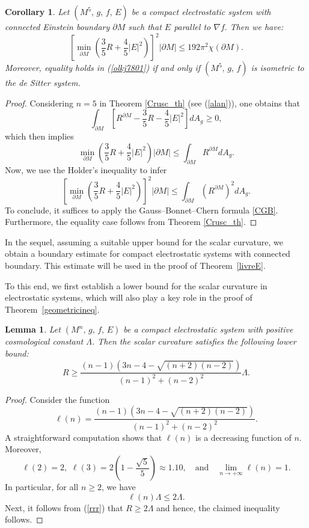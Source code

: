 \documentclass{amsart}
\newtheorem{corollary}{Corollary}
\newtheorem{lemma}{Lemma}
\numberwithin{equation}{section}
\begin{document}
\begin{corollary}\label{coro2alan}
Let $(M^5,\,g,\,f,\,E)$ be a compact electrostatic system with connected Einstein boundary $\partial M$ such that $E$ parallel to $\nabla f.$ Then we have:
		\begin{equation}
		\label{olkj7801}
			\left[\displaystyle\min_{\partial M}\left(\frac{3}{5}R+\frac{4}{5}|E|^{2}\right)\right]^{2}|\partial M|\leq 	192\pi^{2}\chi(\partial M).
		\end{equation} Moreover, equality holds in (\ref{olkj7801}) if and only if $(M^5,\,g,\,f)$ is isometric to the de Sitter system. 
\end{corollary}
	
\begin{proof}
Considering $n=5$ in Theorem \ref{Crusc_th} (see (\ref{alan})), one obtains that
		$$\int_{\partial M}\left[R^{\partial M}-\frac{3}{5}R-\frac{4}{5}|E|^{2}\right]dA_g\geq 0,$$
		which then implies
		$$\displaystyle\min_{\partial M}\left(\frac{3}{5}R+\frac{4}{5}|E|^{2}\right)|\partial M|\leq\int_{\partial M}R^{\partial M}dA_g.$$
		Now, we use the Holder's inequality to infer
		$$\left[\displaystyle\min_{\partial M}\left(\frac{3}{5}R+\frac{4}{5}|E|^{2}\right)\right]^{2}|\partial M|\leq \int_{\partial M}\left(R^{\partial M}\right)^{2}dA_g.$$
To conclude, it suffices to apply the Gauss–Bonnet–Chern formula \eqref{CGB}. Furthermore, the equality case follows from Theorem \ref{Crusc_th}.
\end{proof}

In the sequel, assuming a suitable upper bound for the scalar curvature, we obtain a boundary estimate for compact electrostatic systems with connected boundary. This estimate will be used in the proof of Theorem~\ref{livreE}. 

To this end, we first establish a lower bound for the scalar curvature in electrostatic systems, which will also play a key role in the proof of Theorem~\ref{geometricineq}.
\begin{lemma}\label{lower_scal}
Let $(M^{n},\,g,\,f,\,E)$ be a compact electrostatic system with positive cosmological constant $\Lambda$. Then the scalar curvature satisfies the following lower bound:
\[
R \geq \frac{(n-1)\left(3n - 4 - \sqrt{(n+2)(n-2)}\right)}{(n-1)^2 + (n-2)^2} \Lambda.
\]
\end{lemma}

\begin{proof}
Consider the function
\[
\ell(n) = \frac{(n-1)\left(3n - 4 - \sqrt{(n+2)(n-2)}\right)}{(n-1)^2 + (n-2)^2}.
\]
A straightforward computation shows that $\ell(n)$ is a decreasing function of $n$. Moreover,
\[
\ell(2) = 2,\,\,\ell(3) = 2 \left(1 - \frac{\sqrt{5}}{5} \right) \approx 1.10, \quad \text{and} \quad \lim_{n \to +\infty} \ell(n) = 1.
\]
In particular, for all $n \geq 2$, we have
\[
\ell(n)\Lambda \leq 2\Lambda.
\]
Next, it follows from (\ref{rrr}) that $R \geq 2\Lambda$ and hence, the claimed inequality follows.
\end{proof}
\end{document}
